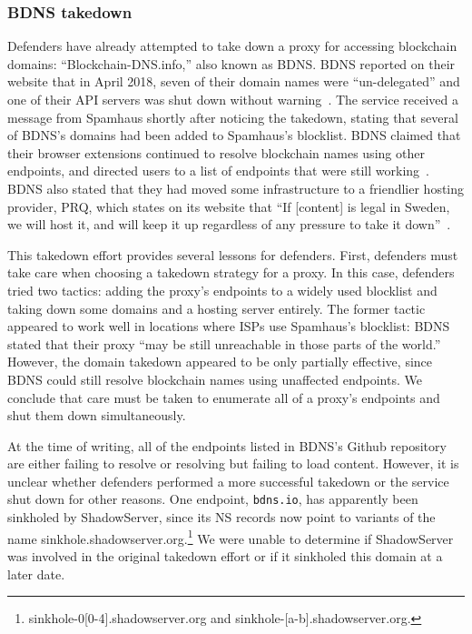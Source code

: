 \subsubsection{BDNS takedown}

Defenders have already attempted to take down a proxy for 
accessing blockchain domains: ``Blockchain-DNS.info,'' also 
known as BDNS. BDNS reported on their website that in April 
2018, seven of their domain names were ``un-delegated'' and 
one of their API servers was shut down without 
warning~\cite{blockchain-dns-info-wayback}. The service 
received a message from Spamhaus shortly after noticing the 
takedown, stating that several of 
BDNS's domains had been added to Spamhaus's blocklist. BDNS 
claimed that their browser extensions continued to resolve 
blockchain names using other endpoints, and directed users to 
a list of endpoints that were still 
working~\cite{github_bdns_wayback}. BDNS also stated that 
they had moved some infrastructure to a friendlier hosting 
provider, PRQ, which states on its website that ``If 
[content] is legal in Sweden, we will host it, and will keep 
it up regardless of any pressure to take it 
down''~\cite{prq}. 

This takedown effort provides several lessons for defenders. 
First, defenders must take care when choosing a takedown 
strategy for a proxy. In this case, defenders tried two 
tactics: 
adding the proxy's endpoints to a widely used blocklist and 
taking down some domains and a hosting server entirely. 
The former tactic appeared to work well in locations where 
ISPs use Spamhaus's blocklist: BDNS stated that their 
proxy ``may be still unreachable in those parts of the 
world.'' However, the domain takedown appeared to be only 
partially effective, since BDNS could still resolve 
blockchain names using unaffected endpoints. We conclude that 
care must be taken to enumerate all of a proxy's endpoints 
and shut them down simultaneously.  

At the time of writing, all of the endpoints listed in BDNS's 
Github repository~\cite{github_bdns_wayback} are either 
failing to resolve or resolving but failing to 
load content. However, it is unclear whether defenders 
performed a more successful takedown or the service shut down 
for other reasons. One endpoint, \texttt{bdns.io}, has 
apparently been sinkholed by ShadowServer, since its NS 
records now point to variants of the name 
sinkhole.shadowserver.org.\footnote{sinkhole-0[0-4].shadowserver.org
and sinkhole-[a-b].shadowserver.org.} We were unable to 
determine if ShadowServer was involved in the original 
takedown effort or if it sinkholed this domain at a later 
date.



